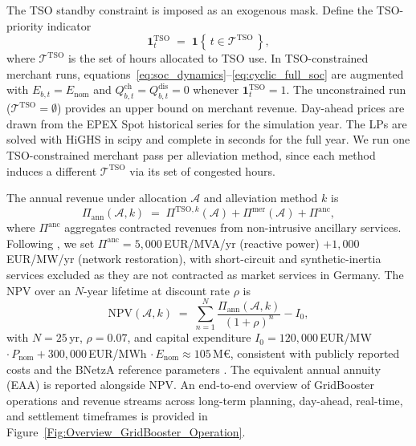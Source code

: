The TSO standby constraint is imposed as an exogenous mask. Define the TSO-priority indicator
\begin{equation}
    \mathbf{1}^{\mathrm{TSO}}_t \;=\; \mathbf{1}\!\left\{\, t \in \mathcal{T}^{\mathrm{TSO}} \,\right\},
\end{equation}
where $\mathcal{T}^{\mathrm{TSO}}$ is the set of hours allocated to TSO use. In TSO-constrained merchant runs, equations~\eqref{eq:soc_dynamics}--\eqref{eq:cyclic_full_soc} are augmented with $E_{b,t} = E_{\mathrm{nom}}$ and $Q_{b,t}^{\mathrm{ch}} = Q_{b,t}^{\mathrm{dis}} = 0$ whenever $\mathbf{1}^{\mathrm{TSO}}_t = 1$. The unconstrained run ($\mathcal{T}^{\mathrm{TSO}} = \emptyset$) provides an upper bound on merchant revenue. Day-ahead prices are drawn from the EPEX Spot historical series for the simulation year. The LPs are solved with HiGHS in scipy and complete in seconds for the full year. We run one TSO-constrained merchant pass per alleviation method, since each method induces a different $\mathcal{T}^{\mathrm{TSO}}$ via its set of congested hours.
 
 


The annual revenue under allocation $\mathcal{A}$ and alleviation method $k$ is
\begin{equation}
    \Pi_{\mathrm{ann}}(\mathcal{A}, k) \;=\;
        \Pi^{\mathrm{TSO},k}(\mathcal{A}) + \Pi^{\mathrm{mer}}(\mathcal{A}) + \Pi^{\mathrm{anc}},
    \label{eq:annual_rev}
\end{equation}
where $\Pi^{\mathrm{anc}}$ aggregates contracted revenues from non-intrusive ancillary services. Following \citet{Fluence_Consentec_2022_GridBooster_Profitability_Assessment}, we set $\Pi^{\mathrm{anc}} = 5{,}000$\,EUR/MVA/yr (reactive power) $+ 1{,}000$\,EUR/MW/yr (network restoration), with short-circuit and synthetic-inertia services excluded as they are not contracted as market services in Germany. The NPV over an $N$-year lifetime at discount rate $\rho$ is
\begin{equation}
    \mathrm{NPV}(\mathcal{A}, k) \;=\;
        \sum_{n=1}^{N} \frac{\Pi_{\mathrm{ann}}(\mathcal{A}, k)}{(1+\rho)^n} - I_0,
    \label{eq:npv}
\end{equation}
with $N = 25$\,yr, $\rho = 0.07$, and capital expenditure $I_0 = 120{,}000$\,EUR/MW $\cdot\,P_{\mathrm{nom}} + 300{,}000$\,EUR/MWh $\cdot\,E_{\mathrm{nom}} \approx 105$\,M\euro{}, consistent with publicly reported costs and the BNetzA reference parameters \citep{NREL_ATB_2024}. The equivalent annual annuity (EAA) is reported alongside NPV. An end-to-end overview of GridBooster operations and revenue streams across long-term planning, day-ahead, real-time, and settlement timeframes is provided in Figure~\ref{Fig:Overview_GridBooster_Operation}.
 
